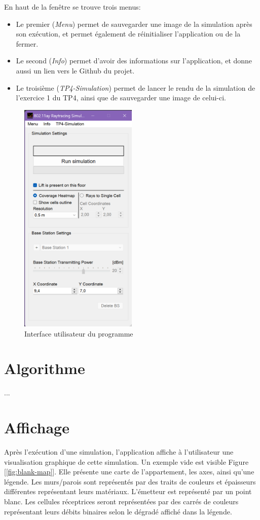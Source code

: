 En haut de la fenêtre se trouve trois menus:
\begin{itemize}
    \item Le premier (\textit{Menu}) permet de sauvegarder une image de la simulation après son exécution, et permet également de réinitialiser l'application ou de la fermer.
    \item Le second (\textit{Info}) permet d'avoir des informations sur l'application, et donne aussi un lien vers le Github du projet.
    \item Le troisième (\textit{TP4-Simulation}) permet de lancer le rendu de la simulation de l'exercice 1 du TP4, ainsi que de sauvegarder une image de celui-ci.
\end{itemize}

\begin{figure}[H]
    \centering
    \includegraphics[width=0.5\textwidth]{latex/images/interface.png}
    \caption{Interface utilisateur du programme}
    \label{fig:interface}
\end{figure}

\section{Algorithme}
...

\section{Affichage}
Après l'exécution d'une simulation, l'application affiche à l'utilisateur une visualisation graphique de cette simulation. Un exemple vide est visible Figure [\ref{fig:blank-map}]. Elle présente une carte de l'appartement, les axes, ainsi qu'une légende. Les murs/parois sont représentés par des traits de couleurs et épaisseurs différentes représentant leurs matériaux. L'émetteur est représenté par un point blanc. Les cellules réceptrices seront représentées par des carrés de couleurs représentant leurs débits binaires selon le dégradé affiché dans la légende.

